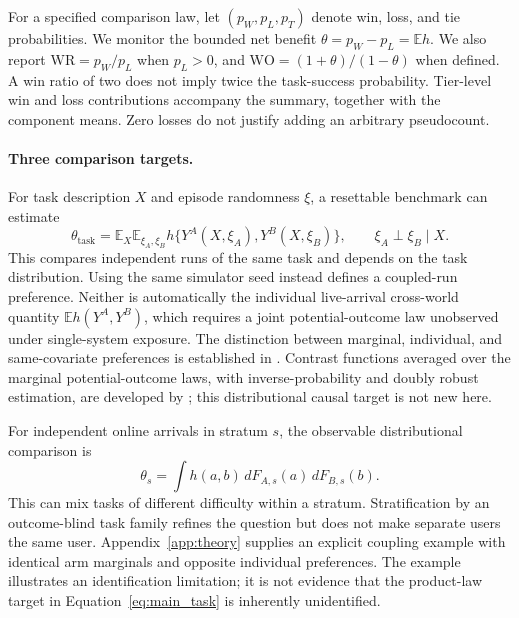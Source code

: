 \documentclass[11pt,letterpaper]{article}
\newcommand{\E}{\mathbb E}
\begin{document}
For a specified comparison law, let $(p_W,p_L,p_T)$ denote win, loss, and
tie probabilities. We monitor the bounded net benefit
$\theta=p_W-p_L=\E h$. We also report $\mathrm{WR}=p_W/p_L$ when $p_L>0$,
and $\mathrm{WO}=(1+\theta)/(1-\theta)$ when defined. A win ratio of two
does not imply twice the task-success probability. Tier-level win and
loss contributions accompany the summary, together with the component
means. Zero losses do not justify adding an arbitrary pseudocount.

\paragraph{Three comparison targets.}
For task description $X$ and episode randomness $\xi$, a resettable
benchmark can estimate
\begin{equation}
 \theta_{\mathrm{task}}=\E_X\E_{\xi_A,\xi_B}
 h\{Y^A(X,\xi_A),Y^B(X,\xi_B)\},\qquad
 \xi_A\perp\xi_B\mid X.
 \label{eq:main_task}
\end{equation}
This compares independent runs of the same task and depends on the task
distribution. Using the same simulator seed instead defines a coupled-run
preference. Neither is automatically the individual live-arrival
cross-world quantity $\E h(Y^A,Y^B)$, which requires a joint
potential-outcome law unobserved under single-system exposure.
The distinction between marginal, individual, and same-covariate
preferences is established in \citet{even2025rethinking}.
Contrast functions averaged over the marginal potential-outcome laws,
with inverse-probability and doubly robust estimation, are developed by
\citet{mao2018causal}; this distributional causal target is not new here.

For independent online arrivals in stratum $s$, the observable
distributional comparison is
\begin{equation}
 \theta_s=\int h(a,b)\,dF_{A,s}(a)\,dF_{B,s}(b).
 \label{eq:main_online}
\end{equation}
This can mix tasks of different difficulty within a stratum. Stratification
by an outcome-blind task family refines the question but does not make
separate users the same user. Appendix~\ref{app:theory} supplies an explicit
coupling example with identical arm marginals and opposite individual
preferences. The example illustrates an identification limitation; it is
not evidence that the product-law target in
Equation~\eqref{eq:main_task} is inherently unidentified.
\end{document}
